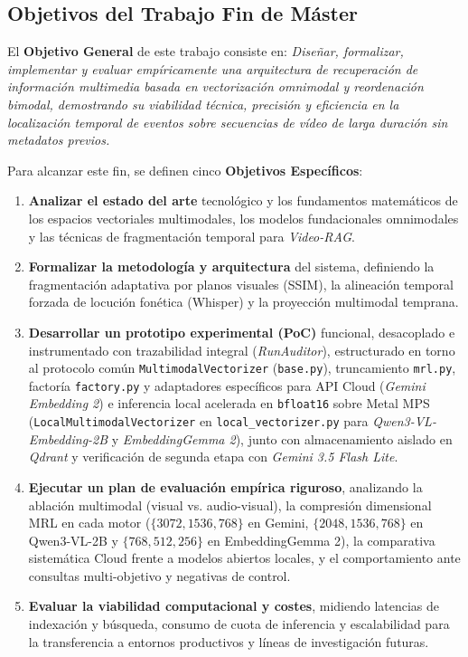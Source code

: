 \subsection{Objetivos del Trabajo Fin de Máster}
\label{subsec:objetivos}

El \textbf{Objetivo General} de este trabajo consiste en: \textit{Diseñar, formalizar, implementar y evaluar empíricamente una arquitectura de recuperación de información multimedia basada en vectorización omnimodal y reordenación bimodal, demostrando su viabilidad técnica, precisión y eficiencia en la localización temporal de eventos sobre secuencias de vídeo de larga duración sin metadatos previos.}

Para alcanzar este fin, se definen cinco \textbf{Objetivos Específicos}:
\begin{enumerate}[label=\textbf{OE\arabic*:}, wide=0pt, leftmargin=*]
    \item \textbf{Analizar el estado del arte} tecnológico y los fundamentos matemáticos de los espacios vectoriales multimodales, los modelos fundacionales omnimodales y las técnicas de fragmentación temporal para \textit{Video-RAG}.
    \item \textbf{Formalizar la metodología y arquitectura} del sistema, definiendo la fragmentación adaptativa por planos visuales (SSIM), la alineación temporal forzada de locución fonética (Whisper) y la proyección multimodal temprana.
    \item \textbf{Desarrollar un prototipo experimental (PoC)} funcional, desacoplado e instrumentado con trazabilidad integral (\textit{RunAuditor}), estructurado en torno al protocolo común \texttt{MultimodalVectorizer} (\texttt{base.py}), truncamiento \texttt{mrl.py}, factoría \texttt{factory.py} y adaptadores específicos para API Cloud (\textit{Gemini Embedding 2}) e inferencia local acelerada en \texttt{bfloat16} sobre Metal MPS (\texttt{LocalMultimodalVectorizer} en \texttt{local\_vectorizer.py} para \textit{Qwen3-VL-Embedding-2B} y \textit{EmbeddingGemma 2}), junto con almacenamiento aislado en \textit{Qdrant} y verificación de segunda etapa con \textit{Gemini 3.5 Flash Lite}.
    \item \textbf{Ejecutar un plan de evaluación empírica riguroso}, analizando la ablación multimodal (visual vs. audio-visual), la compresión dimensional MRL en cada motor ($\{3072, 1536, 768\}$ en Gemini, $\{2048, 1536, 768\}$ en Qwen3-VL-2B y $\{768, 512, 256\}$ en EmbeddingGemma 2), la comparativa sistemática Cloud frente a modelos abiertos locales, y el comportamiento ante consultas multi-objetivo y negativas de control.
    \item \textbf{Evaluar la viabilidad computacional y costes}, midiendo latencias de indexación y búsqueda, consumo de cuota de inferencia y escalabilidad para la transferencia a entornos productivos y líneas de investigación futuras.
\end{enumerate}

